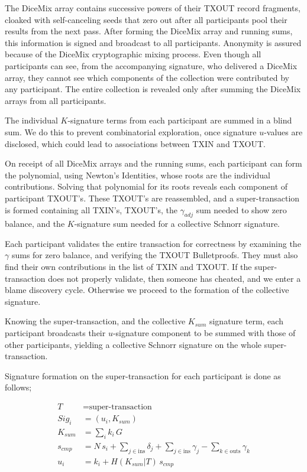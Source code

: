 \documentclass[a4paper, 10pt, conference]{ieeeconf}
\begin{document}
The DiceMix array contains successive powers of their TXOUT record fragments, cloaked with self-canceling seeds that zero out after all participants pool their results from the next pass. After forming the DiceMix array and running sums, this information is signed and broadcast to all participants. Anonymity is assured because of the DiceMix cryptographic mixing process. Even though all participants can see, from the accompanying signature, who delivered a DiceMix array, they cannot see which components of the collection were contributed by any participant. The entire collection is revealed only after summing the DiceMix arrays from all participants.

The individual $K$-signature terms from each participant are summed in a blind sum. We do this to prevent combinatorial exploration, once signature $u$-values are disclosed, which could lead to associations between TXIN and TXOUT.

On receipt of all DiceMix arrays and the running sums, each participant can form the polynomial, using Newton's Identities, whose roots are the individual contributions. Solving that polynomial for its roots reveals each component of participant TXOUT's. These TXOUT's are reassembled, and a super-transaction is formed containing all TXIN's, TXOUT's, the $\gamma_{\mathit{adj}}$ sum needed to show zero balance, and the $K$-signature sum needed for a collective Schnorr signature.

Each participant validates the entire transaction for correctness by examining the $\gamma$ sums for zero balance, and verifying the TXOUT Bulletproofs. They must also find their own contributions in the list of TXIN and TXOUT. If the super-transaction does not properly validate, then someone has cheated, and we enter a blame discovery cycle. Otherwise we proceed to the formation of the collective signature. 

Knowing the super-transaction, and the collective $K_{\mathit{sum}}$ signature term, each participant broadcasts their $u$-signature component to be summed with those of other participants, yielding a collective Schnorr signature on the whole super-transaction.

Signature formation on the super-transaction for each participant is done as follows;

\begin{align*}
T &= \text{super-transaction} \\
Sig_i &= (u_i, K_{sum}) \\
K_{sum} &= \sum_i{k_i \, G} \\
s_{cmp} &= N \, s_i + \sum_{j \in \text{ins}} {\delta_j} + \sum_{j \in \text{ins}} {\gamma_j} - \sum_{k \in \text{outs}} {\gamma_k} \\
u_i &= k_i + H(K_{sum} | T) \,  s_{cmp}\\
\end{align*}
\end{document}
